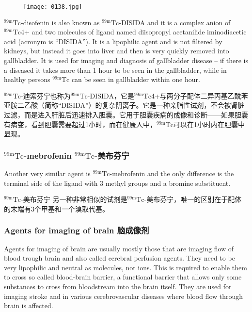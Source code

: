 \documentclass[dvipsnames, svgnames,a4paper,11pt]{article}
\begin{document}
\begin{figure}[h]
	\centering
    \texttt{[image: 0138.jpg]}    
     \label{fig144}
\end{figure}

${}^\mathrm{99m}\mathrm{Tc}$-disofenin is also known as ${}^\mathrm{99m}\mathrm{Tc}$-DISIDA and it is a complex anion of ${}^\mathrm{99m}\mathrm{Tc}$4+
and two molecules of ligand named diisopropyl acetanilide iminodiacetic acid
(acronym is “DISIDA”). It is a lipophilic agent and is not filtered by kidneys, but
instead it goes into liver and then is very quickly removed into gallbladder. It is used
for imaging and diagnosis of gallbladder disease – if there is a diseased it takes
more than 1 hour to be seen in the gallbladder, while in healthy persons ${}^\mathrm{99m}\mathrm{Tc}$ can
be seen in gallbladder within one hour.

${}^\mathrm{99m}\mathrm{Tc}$-迪索芬宁也称为${}^\mathrm{99m}\mathrm{Tc}$-DISIDA，它是${}^\mathrm{99m}\mathrm{Tc}$4+与两分子配体二异丙基乙酰苯亚胺二乙酸（简称“DISIDA”）的复杂阴离子。它是一种亲脂性试剂，不会被肾脏过滤，而是进入肝脏后迅速排入胆囊。它用于胆囊疾病的成像和诊断——如果胆囊有病变，看到胆囊需要超过1小时，而在健康人中，${}^\mathrm{99m}\mathrm{Tc}$可以在1小时内在胆囊中显现。



\subsubsection{${}^\mathrm{99m}\mathrm{Tc}$-mebrofenin ${}^\mathrm{99m}\mathrm{Tc}$-美布芬宁}

Another very similar agent is ${}^\mathrm{99m}\mathrm{Tc}$-mebrofenin and the only difference is the terminal
side of the ligand with 3 methyl groups and a bromine substituent.

${}^\mathrm{99m}\mathrm{Tc}$-美布芬宁 另一种非常相似的试剂是${}^\mathrm{99m}\mathrm{Tc}$-美布芬宁，唯一的区别在于配体的末端有3个甲基和一个溴取代基。

\subsubsection{Agents for imaging of brain 脑成像剂}

Agents for imaging of brain are usually mostly those that are imaging flow of blood
trough brain and also called cerebral perfusion agents. They need to be very
lipophilic and neutral as molecules, not ions. This is required to enable them to cross
so called blood-brain barrier, a functional barrier that allows only some substances to
cross from bloodstream into the brain itself. They are used for imaging stroke and in
various cerebrovascular diseases where blood flow through brain is affected.
\end{document}
